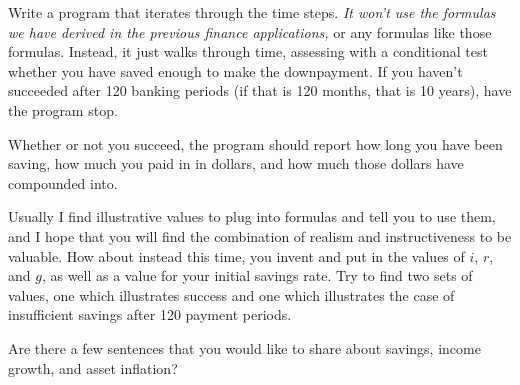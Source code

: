 \bigskip

\nobreak\bigskip

\noindent Write a program that iterates through the time steps. {\it It won't use the formulas we have derived in the previous finance applications,} or any formulas like those formulas. Instead, it just walks through time, assessing with a conditional test whether you have saved enough to make the downpayment. If you haven't succeeded after 120 banking periods (if that is 120 months, that is 10 years), have the program stop.

Whether or not you succeed, the program should report how long you have been saving, how much you paid in in dollars, and how much those dollars have compounded into.

\bigskip


\nobreak\bigskip

\noindent Usually I find illustrative values to plug into formulas and tell you to use them, and I hope that you will find the combination of realism and instructiveness to be valuable. How about instead this time, you invent and put in the values of $i$, $r$, and $g$, as well as a value for your initial savings rate. Try to find two sets of values, one which illustrates success and one which illustrates the case of insufficient savings after 120 payment periods.

\bigskip

\nobreak\bigskip

\noindent Are there a few sentences that you would like to share about savings, income growth, and asset inflation?
\bigskip

\bye
